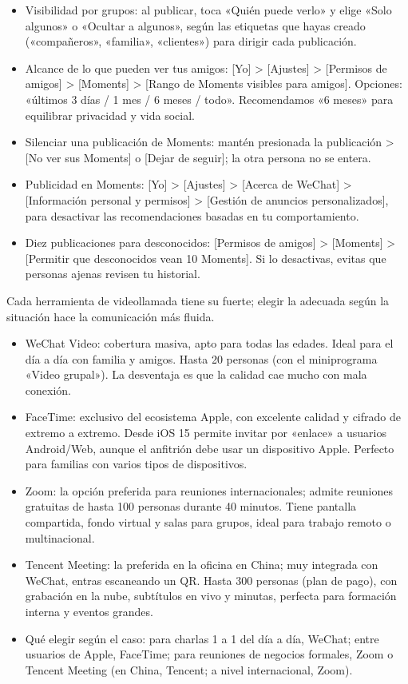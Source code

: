 
\begin{itemize}
  \item Visibilidad por grupos: al publicar, toca «Quién puede verlo» y elige «Solo algunos» o «Ocultar a algunos», según las etiquetas que hayas creado («compañeros», «familia», «clientes») para dirigir cada publicación.
  \item Alcance de lo que pueden ver tus amigos: [Yo] > [Ajustes] > [Permisos de amigos] > [Moments] > [Rango de Moments visibles para amigos]. Opciones: «últimos 3 días / 1 mes / 6 meses / todo». Recomendamos «6 meses» para equilibrar privacidad y vida social.
  \item Silenciar una publicación de Moments: mantén presionada la publicación > [No ver sus Moments] o [Dejar de seguir]; la otra persona no se entera.
  \item Publicidad en Moments: [Yo] > [Ajustes] > [Acerca de WeChat] > [Información personal y permisos] > [Gestión de anuncios personalizados], para desactivar las recomendaciones basadas en tu comportamiento.
  \item Diez publicaciones para desconocidos: [Permisos de amigos] > [Moments] > [Permitir que desconocidos vean 10 Moments]. Si lo desactivas, evitas que personas ajenas revisen tu historial.
\end{itemize}


Cada herramienta de videollamada tiene su fuerte; elegir la adecuada según la situación hace la comunicación más fluida.

\begin{itemize}
  \item WeChat Video: cobertura masiva, apto para todas las edades. Ideal para el día a día con familia y amigos. Hasta 20 personas (con el miniprograma «Video grupal»). La desventaja es que la calidad cae mucho con mala conexión.
  \item FaceTime: exclusivo del ecosistema Apple, con excelente calidad y cifrado de extremo a extremo. Desde iOS 15 permite invitar por «enlace» a usuarios Android/Web, aunque el anfitrión debe usar un dispositivo Apple. Perfecto para familias con varios tipos de dispositivos.
  \item Zoom: la opción preferida para reuniones internacionales; admite reuniones gratuitas de hasta 100 personas durante 40 minutos. Tiene pantalla compartida, fondo virtual y salas para grupos, ideal para trabajo remoto o multinacional.
  \item Tencent Meeting: la preferida en la oficina en China; muy integrada con WeChat, entras escaneando un QR. Hasta 300 personas (plan de pago), con grabación en la nube, subtítulos en vivo y minutas, perfecta para formación interna y eventos grandes.
  \item Qué elegir según el caso: para charlas 1 a 1 del día a día, WeChat; entre usuarios de Apple, FaceTime; para reuniones de negocios formales, Zoom o Tencent Meeting (en China, Tencent; a nivel internacional, Zoom).
\end{itemize}

